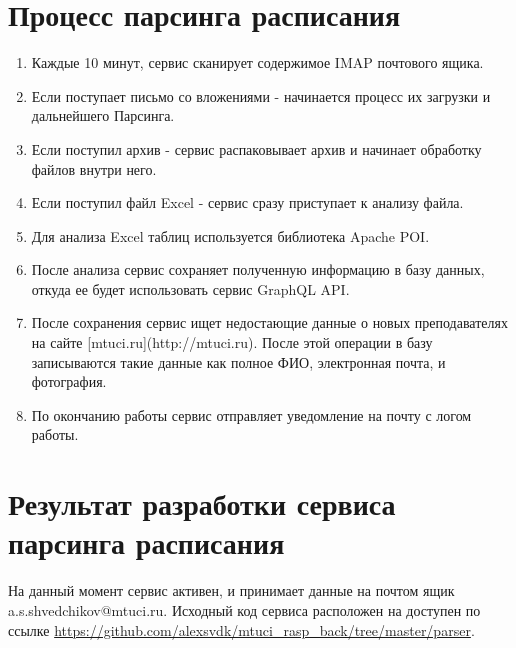 \section{Процесс парсинга расписания}
\begin{enumerate}
\item Каждые 10 минут, сервис сканирует содержимое IMAP почтового ящика.
\item Если поступает письмо со вложениями - начинается процесс их загрузки и дальнейшего Парсинга.
\item Если поступил архив - сервис распаковывает архив и начинает обработку файлов внутри него.
\item Если поступил файл Excel - сервис сразу приступает к анализу файла.
\item Для анализа Excel таблиц используется библиотека Apache POI.
\item После анализа сервис сохраняет полученную информацию в базу данных, откуда ее будет использовать сервис GraphQL API.
\item После сохранения сервис ищет недостающие данные о новых преподавателях на сайте 
[mtuci.ru](http://mtuci.ru). После этой операции в базу записываются такие данные как полное ФИО, 
электронная почта, и фотография.
\item По окончанию работы сервис отправляет уведомление на почту с логом работы.
\end{enumerate}

\section{Результат разработки сервиса парсинга расписания}
На данный момент сервис активен, и принимает данные на почтом ящик a.s.shvedchikov@mtuci.ru. 
Исходный код сервиса расположен на доступен по ссылке \url{https://github.com/alexsvdk/mtuci_rasp_back/tree/master/parser}.